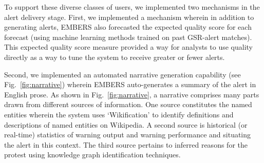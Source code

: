 To support these diverse classes of users, we implemented two
mechanisms in the alert delivery stage. First, we implemented a mechanism wherein in addition to generating alerts, EMBERS
also forecasted the expected quality score for each forecast (using machine learning methods trained on
past GSR-alert matches). This expected quality score measure provided a way for analysts to use quality
directly as a way to tune the system to receive greater or fewer
alerts.  

Second, we implemented an automated narrative generation capability
(see Fig.~\ref{fig:narrative}) wherein EMBERS auto-generates a summary
of the alert in English prose. As shown in Fig.~\ref{fig:narrative},
a narrative comprises many parts drawn from different sources
of information. One source constitutes the named entities wherein the
system uses
`Wikification' to identify definitions and descriptions of 
named entities on Wikipedia. A second source is historical (or real-time)
statistics of warning output and warning performance and situating the
alert in this context. The third source pertains to inferred reasons for
the protest using knowledge graph identification techniques.

